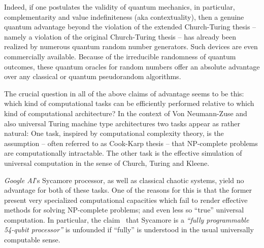 \documentclass[%
   preprint,
 showpacs,
 showkeys,
 preprintnumbers,
 amsmath,amssymb,
 aps,
  pra,
 ]{revtex4-1}
\begin{document}
Indeed, if one postulates the validity of quantum mechanics, in particular, complementarity and value indefiniteness (aka contextuality), then a genuine quantum advantage beyond the violation of the extended Church-Turing thesis
-- namely a violation of the original Church-Turing thesis --
has already been realized by numerous quantum random number generators. Such devices are even commercially available.
Because of the irreducible randomness of quantum outcomes, these quantum oracles for random numbers offer an absolute advantage over any classical or quantum pseudorandom algorithms.

The crucial question in all of the above claims of advantage seems to be this:
which kind of computational tasks can be efficiently performed relative to
which kind of computational architecture?
In the context of Von Neumann-Zuse and also universal Turing machine type architectures two tasks appear as rather natural:
One task, inspired by computational complexity theory, is the assumption -- often referred to as Cook-Karp thesis --
that NP-complete problems are computationally intractable.
The other task is the effective simulation of universal computation in the sense of Church, Turing and Kleene.


{\it Google AI}'s Sycamore processor, as well as classical chaotic systems, yield no advantage for both of these tasks.
One of the reasons for this is that the former present very specialized computational capacities
which fail to render effective methods for solving NP-complete problems; and even less so ``true'' universal computation.
In particular, the claim~\cite{Google-2019-qs} that Sycamore is a {\em ``fully programmable 54-qubit processor''}
is unfounded if ``fully'' is understood in the usual universally computable sense.


\end{document}
